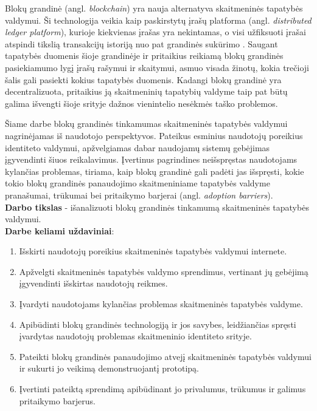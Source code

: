 Blokų grandinė (angl. \textit{blockchain}) yra nauja alternatyva skaitmeninės tapatybės valdymui. Ši technologija veikia kaip
paskirstytų įrašų platforma (angl. \textit{distributed ledger platform}), kurioje kiekvienas įrašas yra nekintamas, o visi
užfiksuoti įrašai atspindi tikslią transakcijų istoriją nuo pat grandinės sukūrimo \cite{Baars2016}. Saugant tapatybės duomenis šioje grandinėje ir
pritaikius reikiamą blokų grandinės pasiekiamumo lygį įrašų rašymui ir skaitymui, asmuo visada
žinotų, kokia trečioji šalis gali pasiekti kokius tapatybės duomenis. Kadangi blokų grandinė yra decentralizuota, pritaikius ją skaitmeninių tapatybių valdyme taip pat
būtų galima išvengti šioje srityje dažnos vienintelio nesėkmės taško problemos. 

Šiame darbe blokų grandinės tinkamumas skaitmeninės tapatybės valdymui nagrinėjamas iš naudotojo perspektyvos.
Pateikus esminius naudotojų poreikius identiteto valdymui,
apžvelgiamas dabar naudojamų sistemų gebėjimas įgyvendinti šiuos reikalavimus. Įvertinus pagrindines neišspręstas naudotojams kylančias problemas,
tiriama, kaip blokų grandinė gali padėti jas išspręsti, kokie tokio blokų grandinės panaudojimo skaitmeniniame tapatybės valdyme
pranašumai, trūkumai bei pritaikymo barjerai (angl. \textit{adoption barriers}).
\\

\textbf{Darbo tikslas} - išanalizuoti blokų grandinės tinkamumą skaitmeninės tapatybės valdymui.
\\

\textbf{Darbe keliami uždaviniai}:

\begin{enumerate}
    \item Išskirti naudotojų poreikius skaitmeninės tapatybės valdymui internete.
    \item Apžvelgti skaitmeninės tapatybės valdymo sprendimus, vertinant jų gebėjimą įgyvendinti išskirtas naudotojų reikmes.
    \item Įvardyti naudotojams kylančias problemas skaitmeninės tapatybės valdyme.
    \item Apibūdinti blokų grandinės technologiją ir jos savybes, leidžiančias spręsti įvardytas
    naudotojų problemas skaitmeninio identiteto srityje.
    \item Pateikti blokų grandinės panaudojimo atvejį skaitmeninės tapatybės valdymui ir sukurti jo veikimą demonstruojantį prototipą.
    \item Įvertinti pateiktą sprendimą apibūdinant jo privalumus, trūkumus ir galimus pritaikymo barjerus.
\end{enumerate}